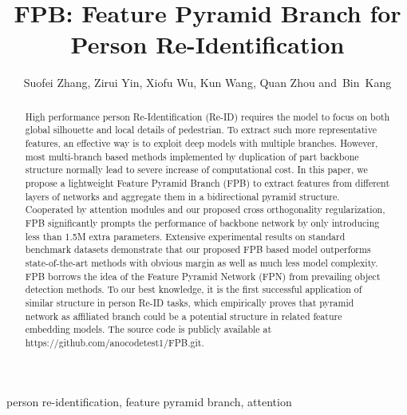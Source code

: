 \documentclass[journal]{IEEEtran}
\begin{document}
\title{FPB: Feature Pyramid Branch for Person Re-Identification}


\author{Suofei Zhang,
       Zirui Yin,
       Xiofu Wu,
       Kun Wang,
       Quan Zhou 
       and~Bin~Kang}



















\maketitle

\begin{abstract}  
  High performance person Re-Identification (Re-ID) requires the model to focus on both global silhouette and local details of pedestrian.
  To extract such more representative features, an effective way is to exploit deep models with multiple branches.
  However, most multi-branch based methods implemented by duplication of part backbone structure normally lead to severe increase of computational cost.
  In this paper, we propose a lightweight Feature Pyramid Branch (FPB) to extract features from different layers of networks and aggregate them in a bidirectional pyramid structure.
  Cooperated by attention modules and our proposed cross orthogonality regularization, FPB significantly prompts the performance of backbone network by only introducing less than 1.5M extra parameters.
  Extensive experimental results on standard benchmark datasets demonstrate that our proposed FPB based model outperforms state-of-the-art methods with obvious margin as well as much less model complexity.
  FPB borrows the idea of the Feature Pyramid Network (FPN) from prevailing object detection methods.
  To our best knowledge, it is the first successful application of similar structure in person Re-ID tasks, which empirically proves that pyramid network as affiliated branch could be a potential structure in related feature embedding models.
  The source code is publicly available at https://github.com/anocodetest1/FPB.git.
\end{abstract}

\begin{IEEEkeywords}
  person re-identification, feature pyramid branch, attention
\end{IEEEkeywords}
\end{document}
